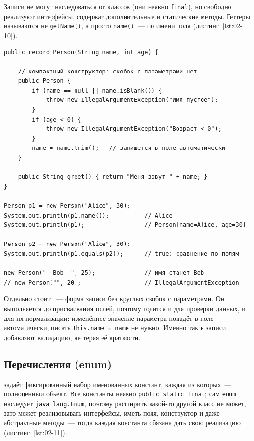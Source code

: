 Записи не могут наследоваться от классов (они неявно \texttt{final}), но
свободно реализуют интерфейсы, содержат дополнительные и статические методы.
Геттеры называются не \texttt{getName()}, а просто \texttt{name()}~--- по имени
поля (листинг~\ref{lst:02-10}).

\begin{listing}[H]
\begin{verbatim}
public record Person(String name, int age) {

    // компактный конструктор: скобок с параметрами нет
    public Person {
        if (name == null || name.isBlank()) {
            throw new IllegalArgumentException("Имя пустое");
        }
        if (age < 0) {
            throw new IllegalArgumentException("Возраст < 0");
        }
        name = name.trim();   // запишется в поле автоматически
    }

    public String greet() { return "Меня зовут " + name; }
}

Person p1 = new Person("Alice", 30);
System.out.println(p1.name());          // Alice
System.out.println(p1);                 // Person[name=Alice, age=30]

Person p2 = new Person("Alice", 30);
System.out.println(p1.equals(p2));      // true: сравнение по полям

new Person("  Bob  ", 25);              // имя станет Bob
// new Person("", 20);                  // IllegalArgumentException
\end{verbatim}
\caption{Запись, её методы и компактный конструктор}
\label{lst:02-10}
\end{listing}

Отдельно стоит ~--- форма записи без круглых
скобок с параметрами. Он выполняется до присваивания полей, поэтому годится и
для проверки данных, и для их нормализации: изменённое значение параметра
попадёт в поле автоматически, писать \texttt{this.name = name} не нужно.
Именно так в записи добавляют валидацию, не теряя её краткости.

\subsection{Перечисления (enum)}

 задаёт фиксированный набор именованных констант, каждая из
которых~--- полноценный объект. Все константы неявно \texttt{public static
final}; сам \texttt{enum} наследует \texttt{java.lang.Enum}, поэтому расширить
какой-то другой класс не может, зато может реализовывать интерфейсы, иметь
поля, конструктор и даже абстрактные методы~--- тогда каждая константа обязана
дать свою реализацию (листинг~\ref{lst:02-11}).

